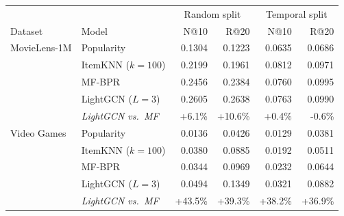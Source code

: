 \begin{tabular}{llrrrr}
\toprule
 & & \multicolumn{2}{c}{Random split} & \multicolumn{2}{c}{Temporal split} \\
Dataset & Model & N@10 & R@20 & N@10 & R@20 \\
\midrule
MovieLens-1M & Popularity & 0.1304 & 0.1223 & 0.0635 & 0.0686 \\
 & ItemKNN ($k{=}100$) & 0.2199 & 0.1961 & 0.0812 & 0.0971 \\
 & MF-BPR & 0.2456 & 0.2384 & 0.0760 & 0.0995 \\
 & LightGCN ($L{=}3$) & 0.2605 & 0.2638 & 0.0763 & 0.0990 \\
 & \emph{LightGCN vs.\ MF} & +6.1\% & +10.6\% & +0.4\% & -0.6\% \\
\midrule
Video Games & Popularity & 0.0136 & 0.0426 & 0.0129 & 0.0381 \\
 & ItemKNN ($k{=}100$) & 0.0380 & 0.0885 & 0.0192 & 0.0511 \\
 & MF-BPR & 0.0344 & 0.0969 & 0.0232 & 0.0644 \\
 & LightGCN ($L{=}3$) & 0.0494 & 0.1349 & 0.0321 & 0.0882 \\
 & \emph{LightGCN vs.\ MF} & +43.5\% & +39.3\% & +38.2\% & +36.9\% \\
\bottomrule
\end{tabular}
